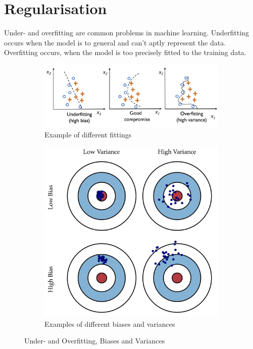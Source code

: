 \documentclass[11pt]{article}
\begin{document}
\section{Regularisation}
Under- and overfitting are common problems in machine learning. Underfitting occurs when the model is to general and can't aptly represent the data. Overfitting occurs, when the model is too precisely fitted to the training data.

\begin{figure}[htb!]
    \centering
    \begin{subfigure}{0.6\linewidth}
        \centering
        \includegraphics[keepaspectratio,width=\linewidth]{Pictures/under_and_overfitting}
        \caption{Example of different fittings}
    \end{subfigure}
    \begin{subfigure}{0.6\linewidth}
        \centering
        \includegraphics[keepaspectratio,width=\linewidth]{Pictures/biases_and_variances}
        \caption{Examples of different biases and variances}
    \end{subfigure}
    \caption{Under- and Overfitting, Biases and Variances}
\end{figure}
\end{document}
